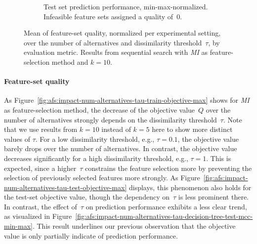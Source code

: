 \documentclass{article}
\theoremstyle{definition}
\begin{document}
\begin{figure}[p]
\begin{subfigure}[t]{0.48\textwidth}
		\caption{
			Test set prediction performance, min-max-normalized.
			Infeasible feature sets assigned a quality of~0.
		}
		\label{fig:afs:impact-num-alternatives-tau-decision-tree-test-mcc-min-max-fillna}
	\end{subfigure}
	\caption{
		Mean of feature-set quality, normalized per experimental setting, over the number of alternatives and dissimilarity threshold~$\tau$, by evaluation metric.
		Results from sequential search with \emph{MI} as feature-selection method and $k=10$.
	}
	\label{fig:afs:impact-num-alternatives-tau-quality}
\end{figure}

\paragraph{Feature-set quality}

As Figure~\ref{fig:afs:impact-num-alternatives-tau-train-objective-max} shows for \emph{MI} as feature-selection method, the decrease of the objective value~$Q$ over the number of alternatives strongly depends on the dissimilarity threshold~$\tau$.
Note that we use results from $k=10$ instead of $k=5$ here to show more distinct values of $\tau$.
For a low dissimilarity threshold, e.g., $\tau=0.1$, the objective value barely drops over the number of alternatives.
In contrast, the objective value decreases significantly for a high dissimilarity threshold, e.g., $\tau=1$.
This is expected, since a higher~$\tau$ constrains the feature selection more by preventing the selection of previously selected features more strongly.
As Figure~\ref{fig:afs:impact-num-alternatives-tau-test-objective-max} displays, this phenomenon also holds for the test-set objective value, though the dependency on~$\tau$ is less prominent there.
In contrast, the effect of~$\tau$ on prediction performance exhibits a less clear trend, as visualized in Figure~\ref{fig:afs:impact-num-alternatives-tau-decision-tree-test-mcc-min-max}.
This result underlines our previous observation that the objective value is only partially indicate of prediction performance.
\end{document}
